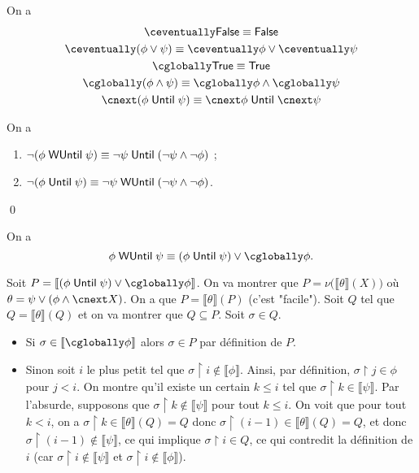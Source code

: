 \documentclass[./main]{subfiles}
\begin{document}
  \begin{exm}
    On a 
    \begin{gather*}
      \eventually \mathsf{False} \equiv \mathsf{False}\\
      \eventually (\phi \lor \psi) \equiv \eventually \phi \lor \eventually \psi\\
      \always \mathsf{True} \equiv \mathsf{True}\\
      \always (\phi \land \psi) \equiv \always \phi \land \always \psi\\
      \nxt (\phi \until \psi) \equiv \nxt \phi \until \nxt \psi
    \end{gather*}
  \end{exm}

  \begin{lem}
    On a
    \begin{enumerate}
      \item $\lnot (\phi \mathrel{\mathsf{WUntil}} \psi) \equiv \lnot \psi \mathrel{\mathsf{Until}} (\lnot \psi \land \lnot \phi)$ ;
      \item $\lnot (\phi \mathrel{\mathsf{Until}} \psi) \equiv \lnot \psi \mathrel{\mathsf{WUntil}} (\lnot \psi \land \lnot \phi)$.
    \end{enumerate}
    \qed
  \end{lem}

  \begin{lem}
    On a 
    \[
    \phi \wuntil \psi \equiv (\phi \until \psi) \lor \always \phi
    .\]
  \end{lem}
  \begin{prv}
    Soit $P = \llbracket (\phi \until \psi) \lor \always \phi \rrbracket$.
    On va montrer que $P = \nu\big(\llbracket \theta\rrbracket(X) \big)$ où $\theta = \psi \lor (\phi \land \nxt X)$.
    On a que  $P = \llbracket \theta\rrbracket(P)$ (c'est "facile").
    Soit $Q$ tel que $Q = \llbracket \theta\rrbracket(Q) $ et on va montrer que $Q \subseteq P$.
    Soit $\sigma \in Q$.
    \begin{itemize}
      \item Si $\sigma \in \llbracket \always \phi\rrbracket $ alors $\sigma \in P$ par définition de $P$.
      \item Sinon soit $i$ le plus petit tel que $\sigma \upharpoonright i \not\in \llbracket \phi\rrbracket$.
        Ainsi, par définition, $\sigma \upharpoonright j \in \phi$ pour $j < i$.
        On montre qu'il existe un certain $k \le i$ tel que $\sigma \upharpoonright k \in \llbracket \psi\rrbracket$.
        Par l'absurde, supposons que $\sigma \upharpoonright k \not\in \llbracket \psi\rrbracket$ pour tout $k \le i$.
        On voit que pour tout $k < i$, on a $\sigma \upharpoonright k \in \llbracket \theta\rrbracket(Q) = Q$ donc $\sigma \upharpoonright (i-1) \in \llbracket \theta\rrbracket(Q) = Q$, et donc $\sigma \upharpoonright (i-1) \not\in  \llbracket \psi\rrbracket$, ce qui implique $\sigma \upharpoonright i \in Q$, ce qui contredit la définition de $i$ (car $\sigma \upharpoonright i \not\in \llbracket \psi\rrbracket $ et $\sigma \upharpoonright i \not\in \llbracket \phi\rrbracket$).
    \end{itemize}
  \end{prv}
\end{document}
